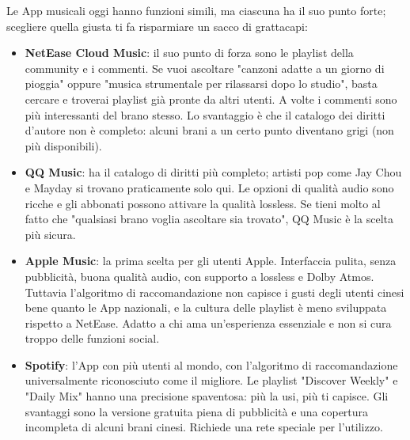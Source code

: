 


Le App musicali oggi hanno funzioni simili, ma ciascuna ha il suo punto forte; scegliere quella giusta ti fa risparmiare un sacco di grattacapi:

\begin{itemize}
  \item \textbf{NetEase Cloud Music}: il suo punto di forza sono le playlist della community e i commenti. Se vuoi ascoltare "canzoni adatte a un giorno di pioggia" oppure "musica strumentale per rilassarsi dopo lo studio", basta cercare e troverai playlist già pronte da altri utenti. A volte i commenti sono più interessanti del brano stesso. Lo svantaggio è che il catalogo dei diritti d'autore non è completo: alcuni brani a un certo punto diventano grigi (non più disponibili).
  \item \textbf{QQ Music}: ha il catalogo di diritti più completo; artisti pop come Jay Chou e Mayday si trovano praticamente solo qui. Le opzioni di qualità audio sono ricche e gli abbonati possono attivare la qualità lossless. Se tieni molto al fatto che "qualsiasi brano voglia ascoltare sia trovato", QQ Music è la scelta più sicura.
  \item \textbf{Apple Music}: la prima scelta per gli utenti Apple. Interfaccia pulita, senza pubblicità, buona qualità audio, con supporto a lossless e Dolby Atmos. Tuttavia l'algoritmo di raccomandazione non capisce i gusti degli utenti cinesi bene quanto le App nazionali, e la cultura delle playlist è meno sviluppata rispetto a NetEase. Adatto a chi ama un'esperienza essenziale e non si cura troppo delle funzioni social.
  \item \textbf{Spotify}: l'App con più utenti al mondo, con l'algoritmo di raccomandazione universalmente riconosciuto come il migliore. Le playlist "Discover Weekly" e "Daily Mix" hanno una precisione spaventosa: più la usi, più ti capisce. Gli svantaggi sono la versione gratuita piena di pubblicità e una copertura incompleta di alcuni brani cinesi. Richiede una rete speciale per l'utilizzo.
\end{itemize}

